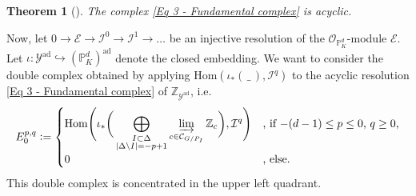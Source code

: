 \documentclass[a4paper, reqno, 10pt]{amsart}
\newtheorem{theorem}{Theorem}[subsection]
\theoremstyle{definition}
\numberwithin{equation}{section}
\newcommand{\abs}[1]{{\lvert{#1}\rvert}}
\newcommand{\ad}{{\mathrm{ad}}}
\newcommand{\blank}{{\,\_\,}}
\newcommand{\defeq}{\vcentcolon=}
\newcommand{\Hom}{{\mathrm{Hom}}}
\newcommand{\ra}{\rightarrow}
\newcommand{\BP}{{\mathbb {P}}}
\newcommand{\BZ}{{\mathbb {Z}}}
\newcommand{\CC}{{\mathcal {C}}}
\newcommand{\CE}{{\mathcal {E}}}
\newcommand{\CI}{{\mathcal {I}}}
\newcommand{\CO}{{\mathcal {O}}}
\newcommand{\CY}{{\mathcal {Y}}}
\begin{document}
\begin{theorem}[{\cite[Thm.\ 2.1.1]{Orlik08EquivVBDrinfeldUpHalfSp}}]
	The complex \eqref{Eq 3 - Fundamental complex} is acyclic.
\end{theorem}



Now, let $0\ra \CE \ra \CI^0 \ra \CI^1 \ra \ldots$ be an injective resolution of the $\CO_{\BP_K^d}$-module $\CE$.
Let $\iota \colon \CY^\ad \hookrightarrow (\BP_K^d)^\ad$ denote the closed embedding.
We want to consider the double complex obtained by applying $\Hom(\iota_\ast(\blank),\CI^q)$ to the acyclic resolution \eqref{Eq 3 - Fundamental complex} of $\BZ_{\CY^\ad}$, i.e.\
\begin{equation}\label{Eq 3 - Double complex for spectral sequence}
	E_0^{p,q} \defeq \begin{cases} \displaystyle
		\Hom \Bigg( \iota_\ast \bigg( \bigoplus\limits_{\substack{I\subset \Delta \\ \abs{\Delta\setminus I}=-p+1}} \varinjlim\limits_{c\in \CC_{G/P_I}} \BZ_c \bigg), \CI^q \Bigg) & \text{, if $-(d-1)\leq p\leq 0$, $q \geq 0$,} \\
		0 & \text{, else.}
	\end{cases}
\end{equation}
This double complex is concentrated in the upper left quadrant.
\end{document}

